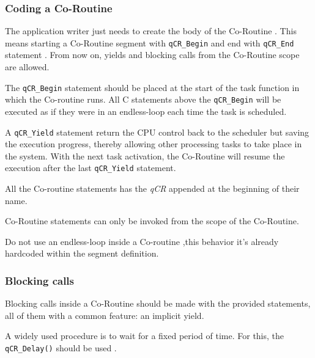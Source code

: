 \subsubsection{Coding a Co-Routine}
The application writer just needs to create the body of the Co-Routine . This means starting a Co-Routine segment with \lstinline{qCR_Begin}  and end with \lstinline{qCR_End} statement . From now on, yields and blocking calls from the Co-Routine scope are allowed.
\medskip

  

The \lstinline{qCR_Begin} statement should be placed at the start of the task function in which the Co-routine runs. All C statements above the \lstinline{qCR_Begin} will be executed as if they were in an endless-loop each time the task is scheduled.

A \lstinline{qCR_Yield}  statement return the CPU control back to the scheduler but saving the execution progress, thereby allowing other processing tasks to take place in the system. With the next task activation, the Co-Routine will resume the execution after the last \lstinline{qCR_Yield} statement.
\medskip

\begin{tcolorbox}
\HandRight All the Co-routine statements has the \textit{qCR} appended at the beginning of their name.
\end{tcolorbox}

\begin{tcolorbox}
\HandRight Co-Routine statements can only be invoked from the scope of the Co-Routine.
\end{tcolorbox}


\begin{tcolorbox}
\HandRight Do not use an endless-loop inside a Co-routine ,this behavior it's already hardcoded within the segment definition.
\end{tcolorbox}

\subsubsection{Blocking calls}
Blocking calls inside a Co-Routine should be made with the provided statements, all of them with a common feature: an implicit yield.

A widely used procedure is to wait for a fixed period of time. For this, the \lstinline{qCR_Delay()} should be used . 
\medskip


